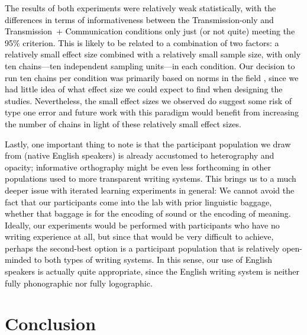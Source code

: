 \documentclass[doc,biblatex]{apa7}
\newcommand\firstrevision[1]{\textcolor{black}{#1}}
\newcommand\secondrevision[1]{\textcolor{black}{#1}}
\begin{document}
\firstrevision{The results of both experiments were relatively weak statistically, with the differences in terms of informativeness between the Transmission-only and Transmission~+ Communication conditions only just (or not quite) meeting the 95\% criterion. This is likely to be related to a combination of two factors: a relatively small effect size combined with a relatively small sample size, with only ten chains---ten independent sampling units---in each condition. \secondrevision{Our decision to run ten chains per condition was primarily based on norms in the field \parencite[e.g.,][]{Kempe:2015, Kirby:2008, Kirby:2015, Raviv:2018, Roberts:2018, Smith:2010, Tamariz:2015}, since we had little idea of what effect size we could expect to find when designing the studies. Nevertheless, the small effect sizes we observed do suggest some risk of type one error and future work with this paradigm would benefit from increasing the number of chains in light of these relatively small effect sizes}.}

\firstrevision{Lastly, one important thing to note is that the participant population we draw from (native English speakers) is already accustomed to heterography and opacity; informative orthography might be even less forthcoming in other populations used to more transparent writing systems. This brings us to a much deeper issue with iterated learning experiments in general: We cannot avoid the fact that our participants come into the lab with prior linguistic baggage, whether that baggage is for the encoding of sound or the encoding of meaning. Ideally, our experiments would be performed with participants who have no writing experience at all, but since that would be very difficult to achieve, perhaps the second-best option is a participant population that is relatively open-minded to both types of writing systems. In this sense, our use of English speakers is actually quite appropriate, since the English writing system is neither fully phonographic nor fully logographic.}

\section{Conclusion}
\end{document}
